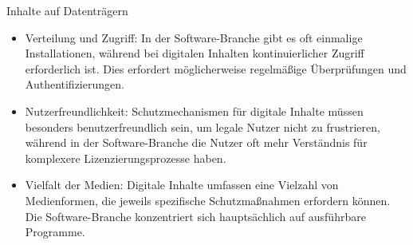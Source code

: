 \documentclass{article}
\begin{document}
\begin{exercise}[1]{Inhalte auf Datenträgern}
\begin{solution}
\begin{enumerate}
\begin{itemize}
              \item Verteilung und Zugriff: In der Software-Branche gibt es oft einmalige Installationen, während bei digitalen Inhalten kontinuierlicher Zugriff erforderlich ist. Dies erfordert möglicherweise regelmäßige Überprüfungen und Authentifizierungen.
              \item Nutzerfreundlichkeit: Schutzmechanismen für digitale Inhalte müssen besonders benutzerfreundlich sein, um legale Nutzer nicht zu frustrieren, während in der Software-Branche die Nutzer oft mehr Verständnis für komplexere Lizenzierungsprozesse haben.
              \item Vielfalt der Medien: Digitale Inhalte umfassen eine Vielzahl von Medienformen, die jeweils spezifische Schutzmaßnahmen erfordern können. Die Software-Branche konzentriert sich hauptsächlich auf ausführbare Programme.
            \end{itemize}
    \end{enumerate}
  \end{solution}
\end{exercise}
\end{document}
